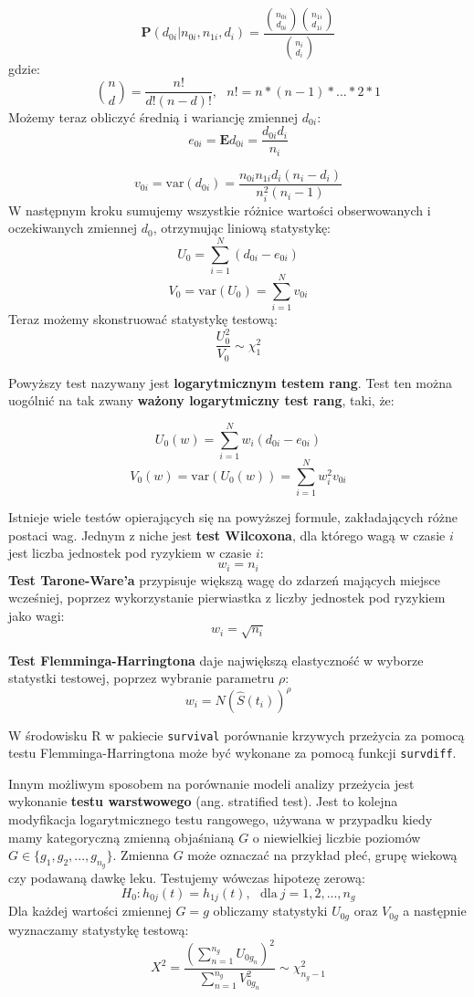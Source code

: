 \documentclass[]{pracamgr}
\begin{document}
\begin{equation}
\mathbf{P}(d_{0i} | n_{0i}, n_{1i}, d_i) = \frac{ \binom{n_{0i}}{d_{0i}} \binom{n_{1i}}{d_{1i}} }{ \binom{n_i}{d_i} }
\end{equation}
gdzie:
$$\binom {n} {d} = \frac{n!}{d!(n-d)!}, \ \ \ n! = n*(n-1)*...*2*1$$
Możemy teraz obliczyć średnią i wariancję zmiennej $d_{0i}$:
$$e_{0i} = \mathbf{E}d_{0i} = \frac{d_{0i}d_i}{n_i}$$

$$v_{0i} = \mathrm{var}(d_{0i}) = \frac{n_{0i}n_{1i}d_i(n_i-d_i)}{n_i^2(n_i-1)} $$
W następnym kroku sumujemy wszystkie różnice wartości obserwowanych i oczekiwanych zmiennej $d_0$, otrzymując liniową statystykę:
$$U_0 = \sum_{i = 1}^N(d_{0i}-e_{0i})$$
$$V_0 = \mathrm{var}(U_0) = \sum_{i = 1}^N v_{0i}$$
Teraz możemy skonstruować statystykę testową:
\begin{equation}
\frac{U_0^2}{V_0} \sim \chi_1^2
\end{equation}

Powyższy test nazywany jest \textbf{logarytmicznym testem rang}. Test ten można uogólnić na tak zwany \textbf{ważony logarytmiczny test rang}, taki, że:

$$U_{0}(w) = \sum_{i = 1}^Nw_i(d_{0i}-e_{0i})$$
$$V_0(w) = \mathrm{var}(U_0(w)) = \sum_{i = 1}^N w_i^2v_{0i}$$

Istnieje wiele testów opierających się na powyższej formule, zakładających różne postaci wag. 
Jednym z niche jest \textbf{test Wilcoxona}, dla którego wagą w czasie $i$ jest liczba jednostek pod ryzykiem w czasie $i$:
$$w_i= n_i$$ 
\textbf{Test Tarone-Ware'a} przypisuje większą wagę do zdarzeń mających miejsce wcześniej, poprzez wykorzystanie pierwiastka z liczby jednostek pod ryzykiem jako wagi:
$$ w_i = \sqrt{n_i}$$

\textbf{Test Flemminga-Harringtona} \cite{Oakes} daje największą elastyczność w wyborze statystki testowej, poprzez wybranie parametru $\rho$:
\begin{equation}
w_i = N(\hat{S}(t_i))^\rho
\end{equation}

W środowisku R w pakiecie \texttt{survival} \cite{survival_package} porównanie krzywych przeżycia za pomocą testu Flemminga-Harringtona może być wykonane za pomocą funkcji \texttt{survdiff}.

Innym możliwym sposobem na porównanie modeli analizy przeżycia jest wykonanie \textbf{testu warstwowego} (ang. stratified test). Jest to kolejna modyfikacja logarytmicznego testu rangowego, używana w przypadku kiedy mamy kategoryczną zmienną objaśnianą $G$ o niewielkiej liczbie poziomów $G \in \{g_1, g_2,...,g_{n_g}\}$. Zmienna $G$ może oznaczać na przykład płeć, grupę wiekową czy podawaną dawkę leku. Testujemy wówczas hipotezę zerową:
$$H_0: h_{0j}(t) = h_{1j}(t), \ \ \ \text{dla} \ j = 1,2,...,n_g$$
Dla każdej wartości zmiennej $G= g$ obliczamy statystyki $U_{0g}$ oraz $V_{0g}$ a następnie wyznaczamy statystykę testową:
$$ X^2 = \frac{(\sum_{n = 1}^{n_g} U_{0g_{n}})^2}{\sum_{n = 1}^{n_g} V_{0g_{n}}^2} \sim \chi_{n_{g}-1}^2 $$
\end{document}
